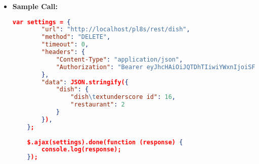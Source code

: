 \begin{itemize}
\begin{itemize}
	\end{itemize}
	\item \textbf{Sample Call:}
	\medskip
	\begin{lstlisting}[language=json]
	var settings = {
		"url": "http://localhost/pl8s/rest/dish",
		"method": "DELETE",
		"timeout": 0,
		"headers": {
			"Content-Type": "application/json",
			"Authorization": "Bearer eyJhcHAiOiJQTDhTIiwiYWxnIjoiSFM1MTIifQ.eyJ1aWQiOjIsInJvbCI6Im1hbmFnZXIiLCzd HIiOiJjdXNfUHc4cUNVWTg4V2gyMG4iLCJkYXQiOjE3MTQyNjE3MDA1MjV9.-shbruJiCHs-8md vaswMNs-9CmzyKGNSkX0vCD8IuJnE8jLgfTjGAT-LdrAHEd5uKS8Hpp0Wn-VQ-OSbyqrEGQ"	
		},
		"data": JSON.stringify({
			"dish": {
				"dish\textunderscore id": 16,
				"restaurant": 2
			}
		}),
	};
	
	$.ajax(settings).done(function (response) {
		console.log(response);
	});
	\end{lstlisting}
	
\end{itemize}

